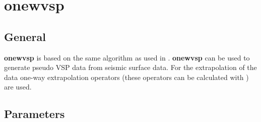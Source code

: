 \newpage
\section{onewvsp} \label{onewvsp}

\subsection{General}

{\bf onewvsp} is based on the same algorithm as used in . {\bf onewvsp} can be used to generate pseudo VSP
data from seismic surface data. For the extrapolation of the data
one-way extrapolation operators (these operators can be calculated
with ) are used.

\subsection{Parameters}

